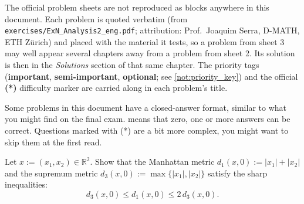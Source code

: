 

\begin{ainote}
The official problem sheets are not reproduced as blocks anywhere in this document. Each problem
is quoted verbatim (from \texttt{exercises/ExN\_Analysis2\_eng.pdf}; attribution: Prof.\ Joaquim
Serra, D-MATH, ETH Z\"urich) and placed with the material it tests, so a problem from sheet 3 may
well appear several chapters away from a problem from sheet 2. Its solution is then in the
\emph{Solutions} section of that same chapter. The priority tags (\textbf{important},
\textbf{semi-important}, \textbf{optional}; see \cref{not:priority_key}) and the official
\textbf{(*)} difficulty marker are carried along in each problem's title.
\end{ainote}

\begin{notation}
Some problems in this document have a closed-answer format, similar to what you might find on the
final exam.  means that zero, one or more answers can be correct. Questions
marked with (*) are a bit more complex, you might want to skip them at the first read.
\end{notation}


\begin{aiexercise}
\label{ex:ai_metric_equivalence}
Let $x := (x_1, x_2) \in \mathbb{R}^2$. Show that the Manhattan metric $d_1(x,0) := |x_1| + |x_2|$ and the supremum metric $d_3(x,0) := \max\{|x_1|, |x_2|\}$ satisfy the sharp inequalities:
\[
d_3(x,0) \leq d_1(x,0) \leq 2 \, d_3(x,0).
\]
\end{aiexercise}


